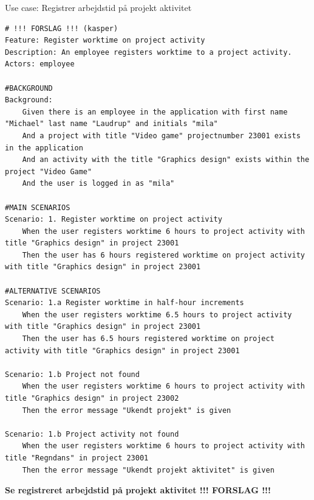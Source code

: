 \begin{listing}[H]
    \centering
    \caption{Use case: Registrer arbejdstid på projekt aktivitet} \label{lst:usecase_register_worktime_projectactivity}
    \begin{verbatim}  
# !!! FORSLAG !!! (kasper)
Feature: Register worktime on project activity
Description: An employee registers worktime to a project activity.
Actors: employee

#BACKGROUND
Background:
    Given there is an employee in the application with first name "Michael" last name "Laudrup" and initials "mila"
    And a project with title "Video game" projectnumber 23001 exists in the application
    And an activity with the title "Graphics design" exists within the project "Video Game"
    And the user is logged in as "mila"

#MAIN SCENARIOS
Scenario: 1. Register worktime on project activity
    When the user registers worktime 6 hours to project activity with title "Graphics design" in project 23001
    Then the user has 6 hours registered worktime on project activity with title "Graphics design" in project 23001

#ALTERNATIVE SCENARIOS
Scenario: 1.a Register worktime in half-hour increments
    When the user registers worktime 6.5 hours to project activity with title "Graphics design" in project 23001
    Then the user has 6.5 hours registered worktime on project activity with title "Graphics design" in project 23001

Scenario: 1.b Project not found
    When the user registers worktime 6 hours to project activity with title "Graphics design" in project 23002
    Then the error message "Ukendt projekt" is given 
    
Scenario: 1.b Project activity not found
    When the user registers worktime 6 hours to project activity with title "Regndans" in project 23001
    Then the error message "Ukendt projekt aktivitet" is given 
    \end{verbatim}
\end{listing}\newpage
\textbf{Se registreret arbejdstid på projekt aktivitet !!! FORSLAG !!!}
